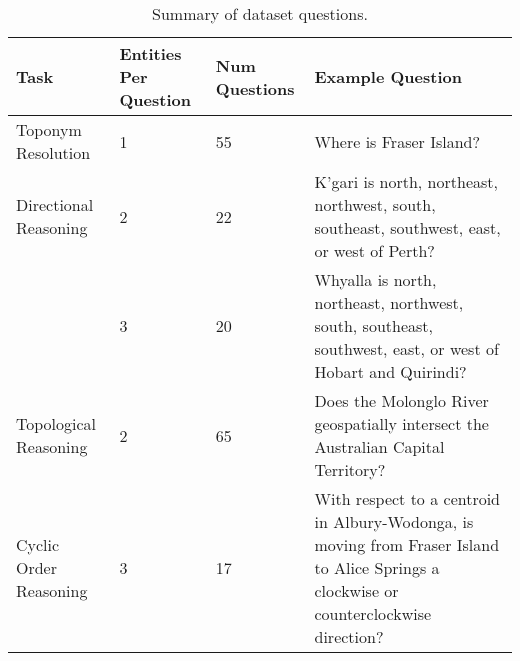 \begingroup
\setlength{\tabcolsep}{4pt}
\renewcommand{\arraystretch}{1.2}
\begin{table*}[ht]
    \centering
    \begin{tabular}{lllp{210pt}}
        \hline
        \hline
        \textbf{Task} & \textbf{Entities Per Question} & \textbf{Num Questions} & \textbf{Example Question} \\
        \hline
        Toponym Resolution     & 1        & 55 & Where is Fraser Island? \\
        Directional Reasoning  & 2        & 22 & K'gari is north, northeast, northwest, south, southeast, southwest, east, or west of Perth? \\
        ~                      & 3        & 20 & Whyalla is north, northeast, northwest, south, southeast, southwest, east, or west of Hobart and Quirindi? \\
        Topological Reasoning  & 2        & 65 & Does the Molonglo River geospatially intersect the Australian Capital Territory? \\
        Cyclic Order Reasoning & 3        & 17 & With respect to a centroid in Albury-Wodonga, is moving from Fraser Island to Alice Springs a clockwise or counterclockwise direction? \\
        \hline
        \hline
    \end{tabular}
    \caption{Summary of dataset questions.}
    \label{tab:dataset_design}
\end{table*}
\endgroup